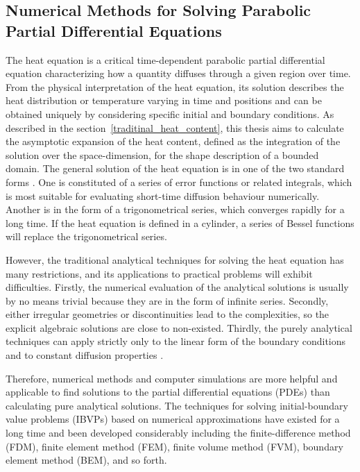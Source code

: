 \subsection{Numerical Methods for Solving Parabolic Partial Differential Equations}\label{numerical_methdos}


The heat equation is a critical time-dependent parabolic partial
differential equation characterizing how a quantity diffuses through a
given region over time. From the physical interpretation of the heat
equation, its solution describes the heat distribution or temperature
varying in time and positions and can be obtained uniquely by
considering specific initial and boundary conditions. As described in
the section~\ref{traditinal_heat_content}, this thesis aims to
calculate the asymptotic expansion of the heat content, defined as the
integration of the solution over the space-dimension, for the shape
description of a bounded domain.  The general solution of the heat
equation is in one of the two standard forms
\cite{crank1979mathematics}. One is constituted of a series of error
functions or related integrals, which is most suitable for evaluating
short-time diffusion behaviour numerically. Another is in the form of
a trigonometrical series, which converges rapidly for a long time. If
the heat equation is defined in a cylinder, a series of Bessel
functions will replace the trigonometrical series.

However, the traditional analytical techniques for solving the heat
equation has many restrictions, and its applications to practical
problems will exhibit difficulties. Firstly, the numerical evaluation
of the analytical solutions is usually by no means trivial because
they are in the form of infinite series. Secondly, either irregular
geometries or discontinuities lead to the complexities, so the
explicit algebraic solutions are close to non-existed. Thirdly, the
purely analytical techniques can apply strictly only to the linear
form of the boundary conditions and to constant diffusion properties
\cite{crank1979mathematics}.

Therefore, numerical methods and computer simulations are more helpful
and applicable to find solutions to the partial differential equations
(PDEs) than calculating pure analytical solutions. The techniques for
solving initial-boundary value problems (IBVPs) based on numerical
approximations have existed for a long time and been developed
considerably including the finite-difference method (FDM), finite
element method (FEM), finite volume method (FVM), boundary element
method (BEM), and so forth.





